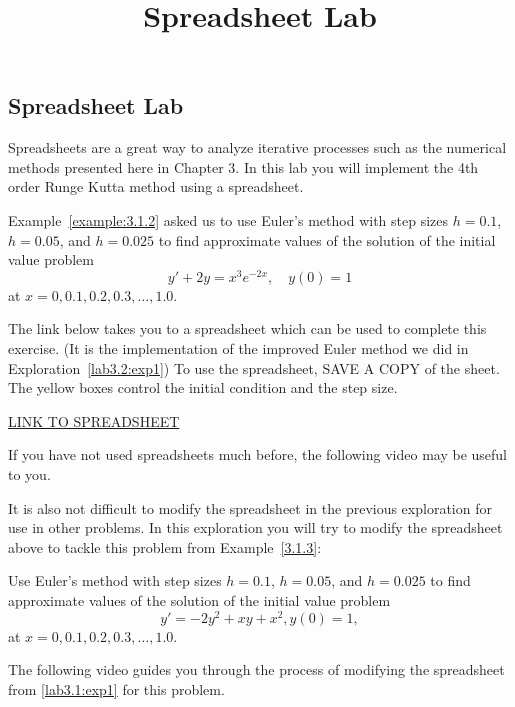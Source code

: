 \documentclass{ximera}
\title{Spreadsheet Lab} \license{CC BY-NC-SA 4.0}
\begin{document}
\begin{abstract}
\end{abstract}
\maketitle

\begin{onlineOnly}
\section*{Spreadsheet Lab}
\end{onlineOnly}
 
Spreadsheets are a great way to analyze iterative processes such as the numerical methods presented here in Chapter 3.  In this lab you will implement the 4th order Runge Kutta method using a spreadsheet.
 
 
\begin{exploration}\label{lab3.3:exp1}
Example~\ref{example:3.1.2} asked us to use Euler's method with step sizes $h=0.1$, $h=0.05$, and $h=0.025$ to
find approximate values of the solution of the initial value problem
$$
y'+2y=x^3e^{-2x},\quad y(0)=1
$$
at $x=0, 0.1, 0.2, 0.3, \ldots, 1.0$.
 
The link below takes you to a spreadsheet which can be used to complete this exercise.  (It is the implementation of the improved Euler method we did in Exploration~\ref{lab3.2:exp1})  To use the spreadsheet, SAVE A COPY of the sheet.  The yellow boxes control the initial condition and the step size. 
     
\href{https://docs.google.com/spreadsheets/d/1UZyfR-vJ-ALm6GqvgHudH_0z-KIjuA2OZvAzZBKa4hc/edit?usp=sharing}{LINK TO SPREADSHEET}

If you have not used spreadsheets much before, the following video may be useful to you.


\end{exploration}
 
\begin{exploration}\label{lab3.3:exp2}
 It is also not difficult to modify the spreadsheet in the previous exploration for use in other problems.  In this exploration you will try to modify the spreadsheet above to tackle this problem from Example~\ref{3.1.3}:

Use Euler's method with step sizes $h=0.1$, $h=0.05$, and $h=0.025$ to
find approximate values of the solution of the initial value problem
$$
y'=-2y^2+xy+x^2, y(0)=1,
$$
at $x=0, 0.1, 0.2, 0.3, \ldots, 1.0$.

The following video guides you through the process of modifying the spreadsheet from \ref{lab3.1:exp1} for this problem.

    
\end{exploration}



 
 




 
\end{document}
